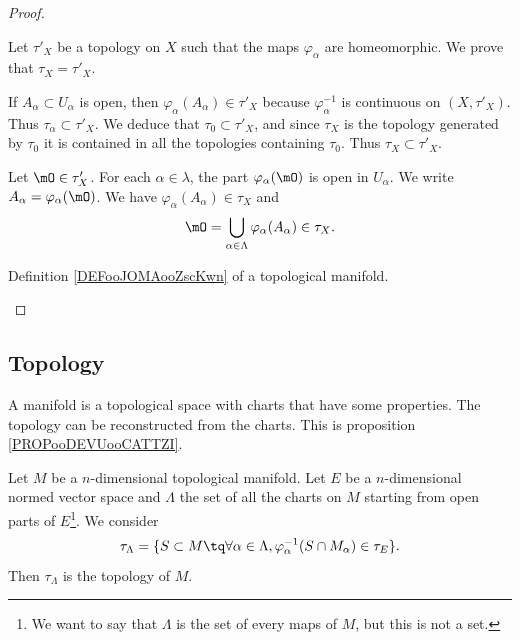 \begin{proof}
\begin{subproof}
		Let \( \tau'_X\) be a topology on \( X\) such that the maps \( \varphi_{\alpha}\) are homeomorphic. We prove that \( \tau_X=\tau'_X\).
		\begin{subproof}
			If \( A_{\alpha}\subset U_{\alpha}\) is open, then \( \varphi_{\alpha}(A_{\alpha})\in\tau'_X\) because \( \varphi_{\alpha}^{-1}\) is continuous on \( (X,\tau'_X)\). Thus \( \tau_{\alpha}\subset\tau'_X\). We deduce that \( \tau_0\subset\tau'_X\), and since \( \tau_X\) is the topology generated by \( \tau_0\) it is contained in all the topologies containing \( \tau_0\). Thus \( \tau_X\subset\tau'_X\).

			Let \( \mO\in\tau'_X\). For each \( \alpha\in\lambda\), the part \( \varphi_{\alpha}(\mO)\) is open in \( U_{\alpha}\). We write \( A_{\alpha}=\varphi_{\alpha}(\mO)\). We have \( \varphi_{\alpha}(A_{\alpha})\in\tau_X\) and
			\begin{equation}
				\mO=\bigcup_{\alpha\in\Lambda}\varphi_{\alpha}(A_{\alpha})\in\tau_X.
			\end{equation}
		\end{subproof}


		Definition \ref{DEFooJOMAooZscKwn} of a topological manifold.

	\end{subproof}
\end{proof}

\subsection{Topology}

A manifold is a topological space with charts that have some properties. The topology can be reconstructed from the charts. This is proposition \ref{PROPooDEVUooCATTZI}.

\begin{proposition}		\label{PROPooDEVUooCATTZI}
	Let \( M\) be a \( n\)-dimensional topological manifold. Let \( E\) be a \( n\)-dimensional normed vector space and \( \Lambda\) the set of all the charts on \( M\) starting from open parts of \( E\)\footnote{We want to say that \( \Lambda\) is the set of every maps of \( M\), but this is not a set.}. We consider
	\begin{equation}
		\tau_{\Lambda}=\{ S\subset M\tq \forall \alpha\in\Lambda,\varphi_{\alpha}^{-1}(S\cap M_{\alpha})\in\tau_E \}.
	\end{equation}
	Then \( \tau_{\Lambda}\) is the topology of \( M\).
\end{proposition}

